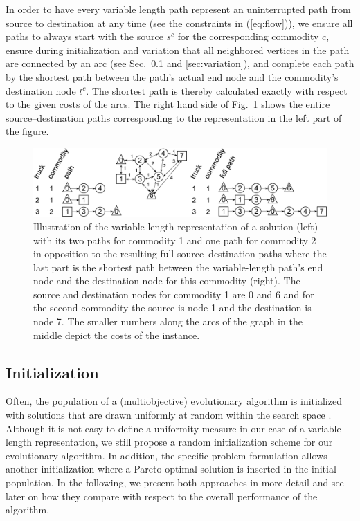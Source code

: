 \documentclass[preprint,12pt]{elsarticle}
\begin{document}
In order to have every variable length path represent an uninterrupted path from source to destination at any time (see the constraints in (\ref{eq:flow})), we ensure all paths to always start with the source $s^c$ for the corresponding commodity $c$, ensure during initialization and variation that all neighbored vertices in the path are connected by an arc (see Sec.~\ref{sec:init} and \ref{sec:variation}), and complete each path by the shortest path between the path's actual end node and the commodity's destination node $t^c$. The shortest path is thereby calculated exactly with respect to the given costs of the arcs. The right hand side of Fig.~\ref{fig:paths} shows the entire source--destination paths corresponding to the representation in the left part of the figure.

\begin{figure}%
\includegraphics[width=\columnwidth]{figs/truckpaths}%
\caption{\label{fig:paths} Illustration of the variable-length representation of a solution (left) with its two paths for commodity 1 and one path for commodity 2 in opposition to the resulting full source--destination paths where the last part is the shortest path between the variable-length path's end node and the destination node for this commodity (right). The source and destination nodes for commodity 1 are 0 and 6 and for the second commodity the source is node 1 and the destination is node 7. The smaller numbers along the arcs of the graph in the middle depict the costs of the instance.}
\end{figure}


\subsection{Initialization}\label{sec:init}
Often, the population of a (multiobjective) evolutionary algorithm is initialized with solutions that are drawn uniformly at random within the search space \citep{deb2001a}. Although it is not easy to define a uniformity measure in our case of a variable-length representation, we still propose a random initialization scheme for our evolutionary algorithm. In addition, the specific problem formulation allows another initialization where a Pareto-optimal solution is inserted in the initial population. In the following, we present both approaches in more detail and see later on how they compare with respect to the overall performance of the algorithm.
\end{document}

